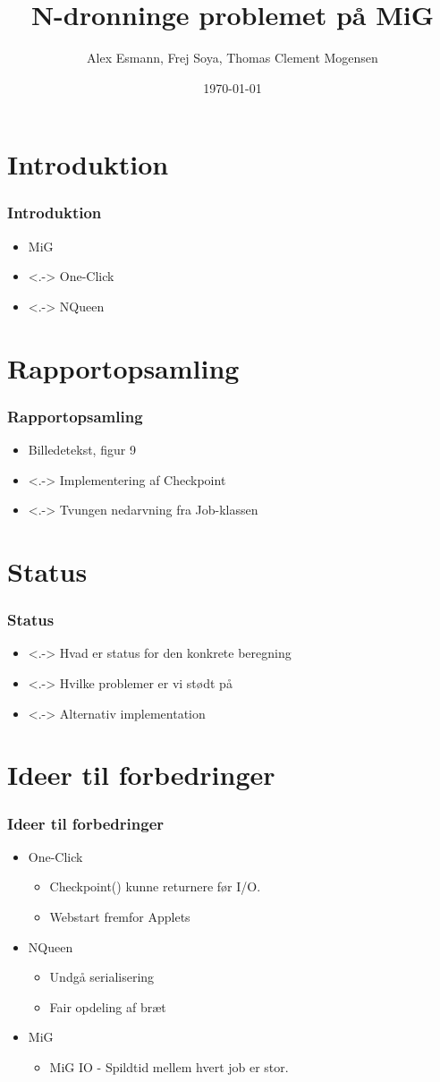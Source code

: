 \documentclass{beamer}
\title{N-dronninge problemet på MiG}
\author{Alex Esmann, Frej Soya, Thomas Clement Mogensen}
\date{\today}
\begin{document}
\frame{\titlepage}
\section{Introduktion}
\frame
{
	\frametitle{Introduktion}

	\begin{itemize}
	\item<1-> MiG
	\item<.-> One-Click
	\item<.-> NQueen
	\end{itemize}
}


\section{Rapportopsamling}
\frame
{
  \frametitle{Rapportopsamling}

  \begin{itemize}
  \item<1-> Billedetekst, figur 9
  \item<.-> Implementering af Checkpoint 
  \item<.-> Tvungen nedarvning fra Job-klassen
  \end{itemize}
}

\section{Status}
\frame
{
  \frametitle{Status}

  \begin{itemize}
  \item<.-> Hvad er status for den konkrete beregning
  \item<.-> Hvilke problemer er vi stødt på
  \item<.-> Alternativ implementation
  \end{itemize}
}

\section{Ideer til forbedringer}
\frame
{
  \frametitle{Ideer til forbedringer}

  \begin{itemize}
		\item<+-> One-Click
		\begin{itemize}
			\item<+-> Checkpoint() kunne returnere før I/O.
			\item<+-> Webstart fremfor Applets
		\end{itemize}
		\item<+-> NQueen 
		\begin{itemize}7
			\item<+-> Undgå serialisering
			\item<+-> Fair opdeling af bræt
		\end{itemize}
				\item<+-> MiG
		\begin{itemize}
			\item<+-> MiG IO - Spildtid mellem hvert job er stor.
		\end{itemize}

  \end{itemize}
}
\end{document}
